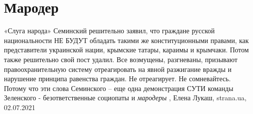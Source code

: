  
 
 
 
 
\chapter{Мародер}

«Слуга народа» Семинский решительно заявил, что граждане русской национальности
НЕ БУДУТ обладать такими же конституционными правами, как представители
украинской нации, крымские татары, караимы и крымчаки.  Потом также решительно
свой пост удалил.  Все возмущены, разгневаны, призывают правоохранительную
систему отреагировать на явной разжигание вражды и нарушение принципа равенства
граждан.  Не отреагирует. Не сомневайтесь.  Потому что эти слова Семинского –
еще одна демонстрация СУТИ команды Зеленского - безответственные социопаты и
\emph{мародеры}
, 
Елена Лукаш, strana.ua, 02.07.2021
